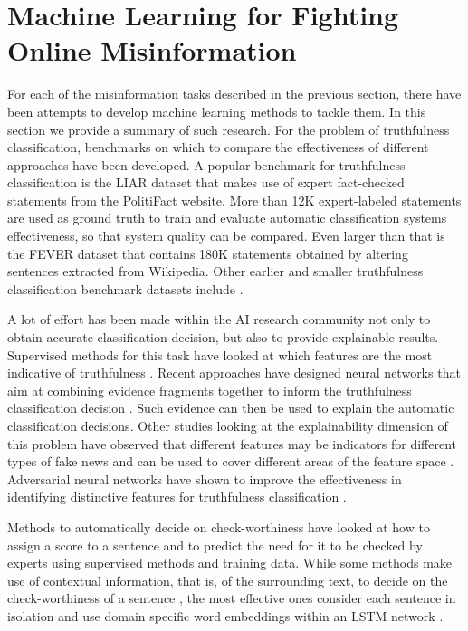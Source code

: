 \documentclass[11pt]{article}
\begin{document}
\section{Machine Learning for Fighting Online Misinformation}
\label{sec:ML}
For each of the misinformation tasks described in the previous section, there have been attempts to develop machine learning methods to tackle them. In this section we provide a summary of such research.
% 
For the problem of truthfulness classification, benchmarks on which to compare the effectiveness of different approaches have been developed. A popular benchmark for truthfulness classification is the LIAR dataset \cite{wang2017liar} that makes use of expert fact-checked statements from the PolitiFact website. More than 12K expert-labeled statements are used as ground truth to train and evaluate automatic classification systems effectiveness, so that system quality can be compared.
% 
Even larger than that is the FEVER dataset \cite{thorne2018fever} that contains 180K statements obtained by altering sentences extracted from Wikipedia.
% 
Other earlier and smaller truthfulness classification benchmark datasets include \cite{vlachos2014fact,ferreira2016emergent}.

A lot of effort has been made within the AI research community not only to obtain accurate classification decision, but also to provide explainable results.
Supervised methods for this task have looked at which features are the most indicative of truthfulness \cite{reis2019supervised}. Recent approaches have designed neural networks that aim at combining evidence fragments together to inform the truthfulness classification decision \cite{wuevidence}. Such evidence  can then be used to explain the automatic classification decisions.
Other studies looking at the explainability dimension of this problem have observed that different features may be indicators for different types of fake news and can be used to cover different areas of the feature space \cite{reis2019explainable}.
Adversarial neural networks have shown to improve the effectiveness in  identifying distinctive features for truthfulness classification \cite{wu2020discovering}.

Methods to automatically decide on check-worthiness \cite{checkthat} have looked at how to assign a score to a sentence and to predict the need for it to be checked by experts using supervised methods and training data. While some methods make use of contextual information, that is, of the surrounding text, to decide on the check-worthiness of a sentence \cite{favano2019theearthisflat}, the most effective ones consider each sentence in isolation and use domain specific word embeddings within an LSTM network \cite{hansen2019neural}.
\end{document}
